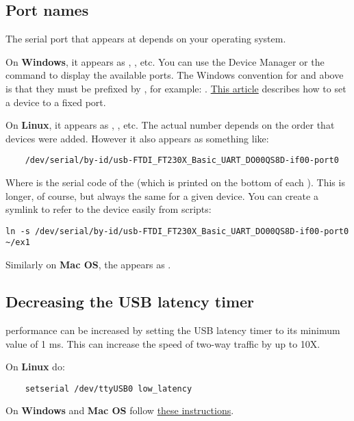 \subsection{Port names}\label{portnames}

The serial port that \device{} appears at depends on your operating system.

On \textbf{Windows}, it appears as , ,  etc.
You can use the Device Manager or the  command to display the available ports.
The Windows convention for  and above is that they must be prefixed by
,
for example:
.
\href{https://plugable.com/2011/07/04/how-to-change-the-com-port-for-a-usb-serial-adapter-on-windows-7/}{This article}
describes how to set a device to a fixed port.

On \textbf{Linux}, it appears as , ,  etc.
The actual number depends on the order that devices were added.
However it also appears as something like:
\begin{lstlisting}
    /dev/serial/by-id/usb-FTDI_FT230X_Basic_UART_DO00QS8D-if00-port0
\end{lstlisting}
Where  is the serial code of the \device{} (which is printed on the bottom of each \device{}).
This is longer, of course, but always the same for a given device.
You can create a symlink to refer to the device easily from scripts:

\begin{lstlisting}
ln -s /dev/serial/by-id/usb-FTDI_FT230X_Basic_UART_DO00QS8D-if00-port0 ~/ex1
\end{lstlisting}

Similarly on \textbf{Mac OS}, the \device{} appears as .

\subsection{Decreasing the USB latency timer}

\device{} performance can be increased by setting the USB latency timer to its minimum value of 1 ms.
This can increase the speed of two-way traffic by up to 10X.

On \textbf{Linux} do:

\begin{lstlisting}
    setserial /dev/ttyUSB0 low_latency
\end{lstlisting}

On \textbf{Windows} and \textbf{Mac OS} follow
\href{https://projectgus.com/2011/10/notes-on-ftdi-latency-with-arduino/}{these instructions}.

